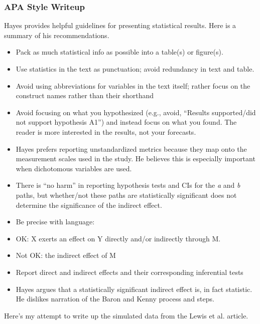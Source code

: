\documentclass[
  11pt,
]{book}
\providecommand{\tightlist}{%
  \setlength{\itemsep}{0pt}\setlength{\parskip}{0pt}}
\begin{document}
\hypertarget{apa-style-writeup-1}{%
\subsubsection{APA Style Writeup}\label{apa-style-writeup-1}}

Hayes \citep{hayes_introduction_2022} provides helpful guidelines for presenting statistical results. Here is a summary of his recommendations.

\begin{itemize}
\tightlist
\item
  Pack as much statistical info as possible into a table(s) or figure(s).
\item
  Use statistics in the text as punctuation; avoid redundancy in text and table.
\item
  Avoid using abbreviations for variables in the text itself; rather focus on the construct names rather than their shorthand
\item
  Avoid focusing on what you hypothesized (e.g., avoid, ``Results supported/did not support hypothesis A1'') and instead focus on what you found. The reader is more interested in the results, not your forecasts.
\item
  Hayes prefers reporting unstandardized metrics because they map onto the measurement scales used in the study. He believes this is especially important when dichotomous variables are used.
\item
  There is ``no harm'' in reporting hypothesis tests and CIs for the \emph{a} and \emph{b} paths, but whether/not these paths are statistically significant does not determine the significance of the indirect effect.
\item
  Be precise with language:
\item
  OK: X exerts an effect on Y directly and/or indirectly through M.
\item
  Not OK: the indirect effect of M\\
\item
  Report direct and indirect effects and their corresponding inferential tests
\item
  Hayes argues that a statistically significant indirect effect is, in fact statistic. He dislikes narration of the Baron and Kenny \citeyearpar{baron_moderator-mediator_1986} process and steps.
\end{itemize}

Here's my attempt to write up the simulated data from the Lewis et al. \citeyearpar{lewis_applying_2017} article.
\end{document}
